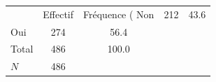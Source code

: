 {
\def\sym#1{\ifmmode^{#1}\else\(^{#1}\)\fi}
\begin{tabular}{l*{1}{cc}}
\toprule
            &    Effectif&Fréquence (%
\midrule
Non         &         212&        43.6\\
Oui         &         274&        56.4\\
Total       &         486&       100.0\\
\midrule
\(N\)       &         486&            \\
\bottomrule
\end{tabular}
}
